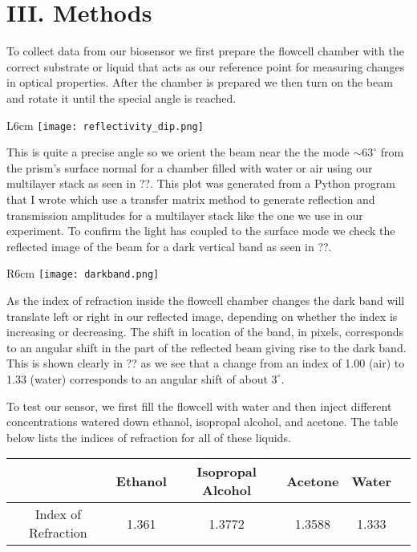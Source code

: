 \section*{III. Methods}
\hspace{0.5in}
To collect data from our biosensor we first prepare the flowcell chamber with the correct substrate or liquid that acts as our reference point for measuring changes in optical properties. After the chamber is prepared we then turn on the beam and rotate it until the special angle is reached. 

\begin{wrapfigure}{L}{6cm}
    \texttt{[image: reflectivity\_dip.png]}
\end{wrapfigure}

This is quite a precise angle so we orient the beam near the the mode $\sim 63^{\circ}$ from the prism's surface normal for a chamber filled with water or air using our multilayer stack as seen in ??. This plot was generated from a Python program that I wrote which use a transfer matrix method to generate reflection and transmission amplitudes for a multilayer stack like the one we use in our experiment. To confirm the light has coupled to the surface mode we check the reflected image of the beam for a dark vertical band as seen in ??.

\begin{wrapfigure}{R}{6cm}
	\texttt{[image: darkband.png]}
\end{wrapfigure}

As the index of refraction inside the flowcell chamber changes the dark band will translate left or right in our reflected image, depending on whether the index is increasing or decreasing. The shift in location of the band, in pixels, corresponds to an angular shift in the part of the reflected beam giving rise to the dark band. This is shown clearly in ?? as we see that a change from an index of 1.00 (air) to 1.33 (water) corresponds to an angular shift  of about $3^\circ$.


To test our sensor, we first fill the flowcell with water and then inject different concentrations watered down ethanol, isopropal alcohol, and acetone. The table below lists the indices of refraction for all of these liquids.
\begin{center}
\begin{tabular}{| c | c c c c c |}
	\hline
    {}      			& Ethanol & Isopropal Alcohol & Acetone & Water \\
	\hline
	Index of Refraction & 1.361   & 1.3772            & 1.3588  & 1.333 \\
    \hline
\end{tabular}
\end{center}
